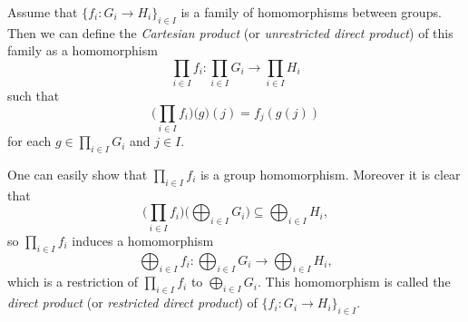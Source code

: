 \documentclass[12pt]{article}
\begin{document}
Assume that $\{f_i:G_i\to H_i\}_{i\in I}$ is a family of homomorphisms between groups. Then we can define the \textit{Cartesian product} (or \textit{unrestricted direct product}) of this family as a homomorphism $$\prod_{i\in I}f_i:\prod_{i\in I} G_i\to \prod_{i\in I}H_i$$ such that $$\bigg( \prod_{i\in I}f_i \bigg) \big( g\big) (j)=f_j(g(j))$$ for each $g\in \prod_{i\in I}G_i$ and $j\in I$.

One can easily show that $\prod_{i\in I}f_i$ is a group homomorphism. Moreover it is clear that $$\bigg( \prod_{i\in I}f_i \bigg) \big( \bigoplus_{i\in I} G_i \big) \subseteq \bigoplus_{i\in I} H_i,$$ so $\prod_{i\in I}f_i$ induces a homomorphism $$\bigoplus_{i\in I}f_i:\bigoplus_{i\in I}G_i\to \bigoplus_{i\in I}H_i,$$ which is a restriction of $\prod_{i\in I}f_i$ to $\bigoplus_{i\in I}G_i$. This homomorphism is called the \textit{direct product} (or \textit{restricted direct product}) of $\{f_i:G_i\to H_i\}_{i\in I}$.
\end{document}
